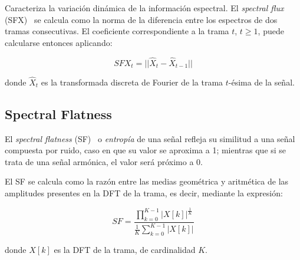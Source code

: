 Caracteriza la variación dinámica de la información espectral.
El \textit{spectral flux} (SFX)~\cite{Fagerlund07,Lasseck14,Zamanian17} se calcula como la norma de la diferencia entre los espectros de dos tramas consecutivas.
El coeficiente correspondiente a la trama $t$, $t\geq 1$, puede calcularse entonces aplicando:

\begin{equation}
    \label{eq:SFX}
    SFX_t = ||\hat{X}_t -\hat{X}_{t-1}||
\end{equation}

\noindent
donde $\hat{X}_t$ es la transformada discreta de Fourier de la trama $t$-ésima de la señal.

\subsection{Spectral Flatness}\label{subsec:spectralFlatness}

El \textit{spectral flatness} (SF)~\cite{Fagerlund07,Peters04,Zamanian17} o \textit{entropía} de una señal refleja su similitud a una señal compuesta por ruido, caso en que su valor se aproxima a 1;
mientras que si se trata de una señal armónica, el valor será próximo a 0.

El SF se calcula como la razón entre las medias geométrica y aritmética de las amplitudes presentes en la DFT de la trama, es decir, mediante la expresión:

\begin{equation}
    \label{eq:SF}
    SF = \frac{\prod_{k=0}^{K-1}{|X[k]|}^{\frac{1}{K}}}{\frac{1}{K}\sum_{k=0}^{K-1}{|X[k]|}}
\end{equation}

\noindent
donde $X[k]$ es la DFT de la trama, de cardinalidad $K$.
